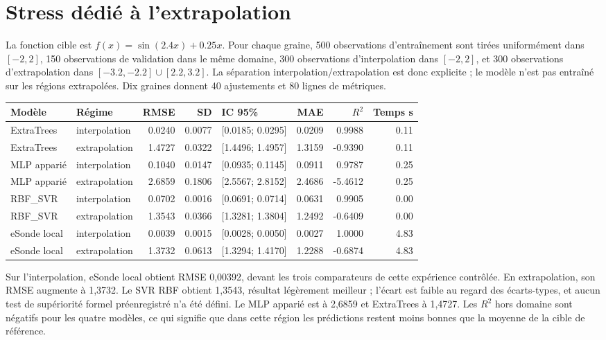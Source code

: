 \documentclass[11pt,a4paper]{article}
\begin{document}
\section{Stress dédié à l'extrapolation}
La fonction cible est $f(x)=\sin(2.4x)+0.25x$. Pour chaque graine, 500 observations d'entraînement sont tirées uniformément dans $[-2,2]$, 150 observations de validation dans le même domaine, 300 observations d'interpolation dans $[-2,2]$, et 300 observations d'extrapolation dans $[-3.2,-2.2]\cup[2.2,3.2]$. La séparation interpolation/extrapolation est donc explicite ; le modèle n'est pas entraîné sur les régions extrapolées. Dix graines donnent 40 ajustements et 80 lignes de métriques.
\begin{longtable}{p{2.7cm}p{2.0cm}r r p{3.4cm}r r r}
\toprule Modèle & Régime & RMSE & SD & IC 95\% & MAE & $R^2$ & Temps s\\\midrule\endhead
ExtraTrees & interpolation & 0.0240 & 0.0077 & [0.0185; 0.0295] & 0.0209 & 0.9988 & 0.11 \\
ExtraTrees & extrapolation & 1.4727 & 0.0322 & [1.4496; 1.4957] & 1.3159 & -0.9390 & 0.11 \\
MLP apparié & interpolation & 0.1040 & 0.0147 & [0.0935; 0.1145] & 0.0911 & 0.9787 & 0.25 \\
MLP apparié & extrapolation & 2.6859 & 0.1806 & [2.5567; 2.8152] & 2.4686 & -5.4612 & 0.25 \\
RBF\_SVR & interpolation & 0.0702 & 0.0016 & [0.0691; 0.0714] & 0.0631 & 0.9905 & 0.00 \\
RBF\_SVR & extrapolation & 1.3543 & 0.0366 & [1.3281; 1.3804] & 1.2492 & -0.6409 & 0.00 \\
eSonde local & interpolation & 0.0039 & 0.0015 & [0.0028; 0.0050] & 0.0027 & 1.0000 & 4.83 \\
eSonde local & extrapolation & 1.3732 & 0.0613 & [1.3294; 1.4170] & 1.2288 & -0.6874 & 4.83 \\
\bottomrule\end{longtable}

Sur l'interpolation, eSonde local obtient RMSE 0,00392, devant les trois comparateurs de cette expérience contrôlée. En extrapolation, son RMSE augmente à 1,3732. Le SVR RBF obtient 1,3543, résultat légèrement meilleur ; l'écart est faible au regard des écarts-types, et aucun test de supériorité formel préenregistré n'a été défini. Le MLP apparié est à 2,6859 et ExtraTrees à 1,4727. Les $R^2$ hors domaine sont négatifs pour les quatre modèles, ce qui signifie que dans cette région les prédictions restent moins bonnes que la moyenne de la cible de référence.
\end{document}
